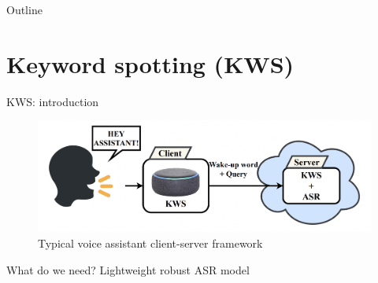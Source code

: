 
\usepackage{tikz}
\usetikzlibrary{arrows,shapes,positioning,shadows,trees}

\begin{frame}
\titlepage
\end{frame}
\begin{frame}{Outline}
	\tableofcontents
\end{frame}

\section{Keyword spotting (KWS)}
\begin{frame}{KWS: introduction}
    \begin{figure}
    	\centering
    	\includegraphics[width=0.99\linewidth]{figs/kws_pipeline.png}
    	\caption{Typical voice assistant client-server framework}
    \end{figure}
    What do we need? Lightweight robust ASR model
    

\end{frame}
